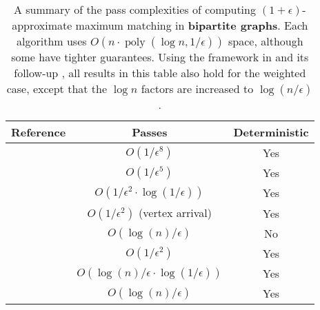 \documentclass{article}
\newcommand{\eps}{\epsilon}
\DeclareMathOperator{\poly}{poly}
\begin{document}
\begin{table}[h]
\centering
\setlength{\extrarowheight}{4pt}
\begin{tabular}{|c|c|c|}
\hline
Reference & Passes & Deterministic \\ \hline
\cite{eggert2009bipartite} & $O(1/\eps^8)$ & Yes \\ \hline
\cite{eggert2012bipartite} & $O(1/\eps^5)$ & Yes \\ \hline
\cite{ahn2013linear} & $O(1/\eps^2 \cdot \log (1/\eps))$ & Yes \\ \hline
\cite{kapralov2013better} & $O(1/\eps^2)$ (vertex arrival) & Yes \\ \hline
\cite{ahn2018access} & $O(\log{(n)}/\eps)$  & No \\ \hline
\cite{assadi2021auction} & $O(1/\eps^2)$ & Yes \\ \hline
\cite{assadi2022semi} & $O(\log(n)/\eps \cdot \log (1/\eps))$ & Yes \\ \hline
\cite{assadi2024simple} & $O(\log{(n)}/\eps)$  & Yes \\ \hline
\end{tabular}

\caption{\label{table:runningtimes} A summary of the pass complexities of computing $(1+\eps)$-approximate maximum matching in \textbf{bipartite graphs}. Each algorithm uses $O(n \cdot \poly(\log n, 1/\eps))$ space, although some have tighter guarantees.
Using the framework in \cite{Bernstein2021} and its follow-up \cite{Bernstein2025}, all results in this table also hold for the weighted case, except that the $\log n$ factors are increased to $\log(n / \eps)$.
}
\end{table}
\end{document}
